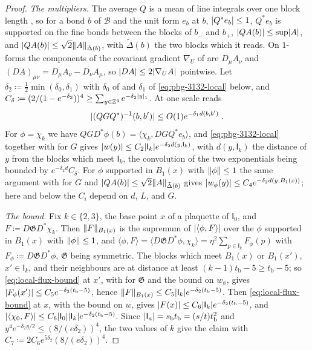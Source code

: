 \documentclass[11pt]{preprint}
\DeclarePairedDelimiter{\abs}{\lvert}{\rvert}
\DeclarePairedDelimiter{\norm}{\lVert}{\rVert}
\numberwithin{equation}{section}
\theoremstyle{definition}
\theoremstyle{remark}
\theoremstyle{plain}
\begin{document}
\begin{proof}
\emph{The multipliers.} The average $Q$ is a mean of line integrals over one block length \cite[(1.18), p.~20]{BalabanPRT1}, so for a bond $b$ of $\mathcal B$ and the unit form $e_b$ at $b$, $\abs{Q^*e_b} \leq 1$, $Q^*e_b$ is supported on the fine bonds between the blocks of $b_-$ and $b_+$, $\abs{QA(b)} \leq \sup\abs A$, and $\abs{QA(b)} \leq \sqrt2\norm A_{\tilde\Delta(b)}$, with $\tilde\Delta(b)$ the two blocks which it reads. On $1$-forms the components of the covariant gradient $\nabla_U$ of \cite[(3.39), p.~397]{BalabanPBG} are $D_\mu A_\nu$ and $(DA)_{\mu\nu} = D_\mu A_\nu - D_\nu A_\mu$, so $\abs{DA} \leq 2\abs{\nabla_UA}$ pointwise. Let $\delta_2 \coloneqq \frac12\min(\delta_0, \delta_1)$ with $\delta_0$ of \cite[Theorem~3.1]{BalabanPBG} and $\delta_1$ of \eqref{eq:pbg-3132-local} below, and $C_\delta \coloneqq (2/(1 - e^{-\delta_2}))^4 \geq \sum_{y \in \mathbb Z^4}e^{-\delta_2\abs y_1}$. At one scale \cite[(3.132)]{BalabanPBG} reads
\begin{equation}\label{eq:pbg-3132-local}
    \abs{(QGQ^*)^{-1}(b, b')} \leq O(1)e^{-\delta_1d(b,b')}\;.
\end{equation}
For $\phi = \chi_k$ we have $QGD^*\phi(b) = \langle\chi_k, DGQ^*e_b\rangle$, and \eqref{eq:pbg-3132-local} together with \cite[(3.42)]{BalabanPBG} for $G$ \cite[Theorem~3.3]{BalabanPBG} gives $\abs{w(y)} \leq C_2\abs{\mathsf I_k}e^{-\delta_2d(y,\mathsf I_k)}$, with $d(y, \mathsf I_k)$ the distance of $y$ from the blocks which meet $\mathsf I_k$, the convolution of the two exponentials being bounded by $e^{-\delta_2d}C_\delta$. For $\phi$ supported in $B_1(x)$ with $\norm\phi \leq 1$ the same argument with \cite[(3.46)]{BalabanPBG} for $G$ and $\abs{QA(b)} \leq \sqrt2\norm A_{\tilde\Delta(b)}$ gives $\abs{w_\phi(y)} \leq C_4e^{-\delta_2d(y,B_1(x))}$; here and below the $C_i$ depend on $d$, $L$, and $G$.

\emph{The bound.} Fix $k \in \{ 2, 3 \}$, the base point $x$ of a plaquette of $\mathsf I_0$, and $F \coloneqq D\mathfrak GD^*\chi_k$. Then $\norm F_{B_1(x)}$ is the supremum of $\abs{\langle\phi, F\rangle}$ over the $\phi$ supported in $B_1(x)$ with $\norm\phi \leq 1$, and $\langle\phi, F\rangle = \langle D\mathfrak GD^*\phi, \chi_k\rangle = \eta^2\sum_{p \in \mathsf I_k}F_\phi(p)$ with $F_\phi \coloneqq D\mathfrak GD^*\phi$, $\mathfrak G$ being symmetric. The blocks which meet $B_1(x)$ or $B_1(x')$, $x' \in \mathsf I_k$, and their neighbours are at distance at least $(k - 1)t_{\mathrm b} - 5 \geq t_{\mathrm b} - 5$; so \eqref{eq:local-flux-bound} at $x'$, with \cite[(3.46)]{BalabanPBG} for $\mathfrak G$ and the bound on $w_\phi$, gives $\abs{F_\phi(x')} \leq C_5e^{-\delta_2(t_{\mathrm b}-5)}$, hence $\norm F_{B_1(x)} \leq C_5\abs{\mathsf I_k}e^{-\delta_2(t_{\mathrm b}-5)}$. Then \eqref{eq:local-flux-bound} at $x$, with the bound on $w$, gives $\abs{F(x)} \leq C_6\abs{\mathsf I_k}e^{-\delta_2(t_{\mathrm b}-5)}$, and $\abs{\langle\chi_0, F\rangle} \leq C_6\abs{\mathsf I_0}\abs{\mathsf I_k}e^{-\delta_2(t_{\mathrm b}-5)}$. Since $\abs{\mathsf I_a} = s_{\mathrm b}t_{\mathrm b} = (s/t)t_{\mathrm b}^2$ and $y^4e^{-\delta_2y/2} \leq (8/(e\delta_2))^4$, the two values of $k$ give the claim with $C_7 \coloneqq 2C_6e^{5\delta_2}(8/(e\delta_2))^4$.
\end{proof}
\end{document}

